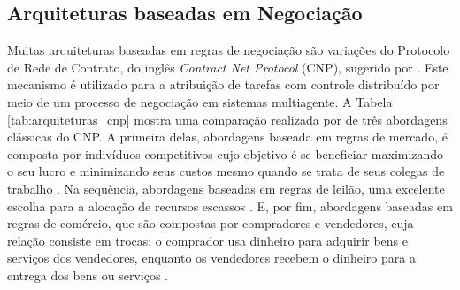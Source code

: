            \subsection{Arquiteturas baseadas em Negociação} \label{subsec:arch_mercado}
                Muitas arquiteturas baseadas em regras de negociação são variações do Protocolo de Rede de Contrato, do inglês \textit{Contract Net Protocol} (CNP), sugerido por . Este mecanismo é utilizado para a atribuição de tarefas com controle distribuído por meio de um processo de negociação em sistemas multiagente. A Tabela \ref{tab:arquiteturas_cnp} mostra uma comparação realizada por  de três abordagens clássicas do CNP. A primeira delas, abordagens baseada em regras de mercado, é composta por indivíduos competitivos cujo objetivo é se beneficiar maximizando o seu lucro e minimizando seus custos mesmo quando se trata de seus colegas de trabalho \cite{ref:zlot2006auction}.
                Na sequência, abordagens baseadas em regras de leilão, uma excelente escolha para a alocação de recursos escassos \cite{ref:gerkey2002murdoch}. E, por fim, abordagens baseadas em regras de comércio, que são compostas por compradores e vendedores, cuja relação consiste em trocas: o comprador usa dinheiro para adquirir bens e serviços dos vendedores, enquanto os vendedores recebem o dinheiro para a entrega dos bens ou serviços \cite{ref:yan2011trade}.
                
